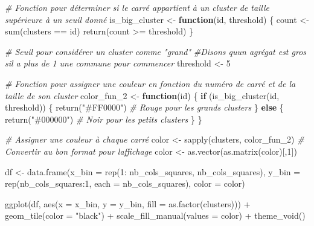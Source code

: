 \documentclass[
]{article}
\newenvironment{Shaded}{\begin{snugshade}}{\end{snugshade}}
\newcommand{\AttributeTok}[1]{\textcolor[rgb]{0.77,0.63,0.00}{#1}}
\newcommand{\CommentTok}[1]{\textcolor[rgb]{0.56,0.35,0.01}{\textit{#1}}}
\newcommand{\ControlFlowTok}[1]{\textcolor[rgb]{0.13,0.29,0.53}{\textbf{#1}}}
\newcommand{\DecValTok}[1]{\textcolor[rgb]{0.00,0.00,0.81}{#1}}
\newcommand{\FunctionTok}[1]{\textcolor[rgb]{0.00,0.00,0.00}{#1}}
\newcommand{\NormalTok}[1]{#1}
\newcommand{\OtherTok}[1]{\textcolor[rgb]{0.56,0.35,0.01}{#1}}
\newcommand{\SpecialCharTok}[1]{\textcolor[rgb]{0.00,0.00,0.00}{#1}}
\newcommand{\StringTok}[1]{\textcolor[rgb]{0.31,0.60,0.02}{#1}}
\begin{document}
\begin{Shaded}
\begin{Highlighting}[]
\CommentTok{\# Fonction pour déterminer si le carré appartient à un cluster de taille supérieure à un seuil donné}
\NormalTok{is\_big\_cluster }\OtherTok{\textless{}{-}} \ControlFlowTok{function}\NormalTok{(id, threshold) \{}
\NormalTok{  count }\OtherTok{\textless{}{-}} \FunctionTok{sum}\NormalTok{(clusters }\SpecialCharTok{==}\NormalTok{ id)}
  \FunctionTok{return}\NormalTok{(count }\SpecialCharTok{\textgreater{}=}\NormalTok{ threshold)}
\NormalTok{\}}

\CommentTok{\# Seuil pour considérer un cluster comme "grand"}
\CommentTok{\#Disons qu\textquotesingle{}un agrégat est gros s\textquotesingle{}il a plus de 1 une commune pour commencer}
\NormalTok{threshold }\OtherTok{\textless{}{-}} \DecValTok{5}

\CommentTok{\# Fonction pour assigner une couleur en fonction du numéro de carré et de la taille de son cluster}
\NormalTok{color\_fun\_2 }\OtherTok{\textless{}{-}} \ControlFlowTok{function}\NormalTok{(id) \{}
  \ControlFlowTok{if}\NormalTok{ (}\FunctionTok{is\_big\_cluster}\NormalTok{(id, threshold)) \{}
    \FunctionTok{return}\NormalTok{(}\StringTok{"\#FF0000"}\NormalTok{) }\CommentTok{\# Rouge pour les grands clusters}
\NormalTok{  \} }\ControlFlowTok{else}\NormalTok{ \{}
    \FunctionTok{return}\NormalTok{(}\StringTok{"\#000000"}\NormalTok{) }\CommentTok{\# Noir pour les petits clusters}
\NormalTok{  \}}
\NormalTok{\}}

\CommentTok{\# Assigner une couleur à chaque carré}
\NormalTok{color }\OtherTok{\textless{}{-}} \FunctionTok{sapply}\NormalTok{(clusters, color\_fun\_2)}
\CommentTok{\# Convertir au bon format pour l\textquotesingle{}affichage}
\NormalTok{color }\OtherTok{\textless{}{-}} \FunctionTok{as.vector}\NormalTok{(}\FunctionTok{as.matrix}\NormalTok{(color)[,}\DecValTok{1}\NormalTok{])}

\NormalTok{df }\OtherTok{\textless{}{-}} \FunctionTok{data.frame}\NormalTok{(}\AttributeTok{x\_bin =} \FunctionTok{rep}\NormalTok{(}\DecValTok{1}\SpecialCharTok{:}\NormalTok{ nb\_cols\_squares, nb\_cols\_squares), }
                 \AttributeTok{y\_bin =} \FunctionTok{rep}\NormalTok{(nb\_cols\_squares}\SpecialCharTok{:}\DecValTok{1}\NormalTok{, }\AttributeTok{each =}\NormalTok{ nb\_cols\_squares), }
                 \AttributeTok{color =}\NormalTok{ color)}

\FunctionTok{ggplot}\NormalTok{(df, }\FunctionTok{aes}\NormalTok{(}\AttributeTok{x =}\NormalTok{ x\_bin, }\AttributeTok{y =}\NormalTok{ y\_bin, }\AttributeTok{fill =} \FunctionTok{as.factor}\NormalTok{(clusters))) }\SpecialCharTok{+}
  \FunctionTok{geom\_tile}\NormalTok{(}\AttributeTok{color =} \StringTok{"black"}\NormalTok{) }\SpecialCharTok{+}
  \FunctionTok{scale\_fill\_manual}\NormalTok{(}\AttributeTok{values =}\NormalTok{ color) }\SpecialCharTok{+}
  \FunctionTok{theme\_void}\NormalTok{()}
\end{Highlighting}
\end{Shaded}
\end{document}
